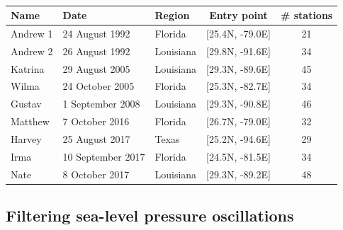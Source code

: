 \begin{table}
	\centering
	\begin{tabular}{ l  l  l  c c }
		\hline
		Name & Date & Region & Entry point & \# stations\\
		\hline \hline
		Andrew 1 &  24 August 1992 &      Florida     &   [25.4N,    -79.0E] &21\\

		Andrew 2 &  26 August 1992 &      Louisiana  &  [29.8N,  -91.6E]&34\\

		Katrina &   29 August 2005 &     Louisiana &   [29.3N,   -89.6E]&45\\

		Wilma &     24 October 2005 &   Florida     &   [25.3N,    -82.7E]&34\\

		Gustav &  1 September 2008 &   Louisiana & [29.3N,    -90.8E]&46\\

		Matthew &  7 October 2016 & Florida     & [26.7N,    -79.0E]&32\\

		Harvey  &  25 August 2017 &      Texas       &  [25.2N,    -94.6E]&29\\

		Irma &        10 September 2017 & Florida    &  [24.5N,    -81.5E]&34\\

		Nate &       8 October 2017 &    Louisiana &   [29.3N,   -89.2E]&48\\
		\hline
	\end{tabular}
	\caption{}\label{tab:TC:9hurricanes}
\end{table}

\subsection{Filtering sea-level pressure oscillations}
\label{subsec:TC:data:oscillations}

